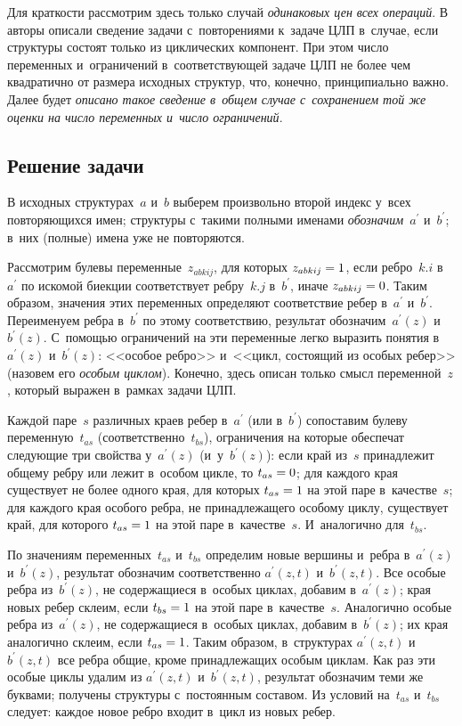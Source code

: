 \begin{multicols}{2}
  Для краткости рассмотрим здесь только случай \textit{одинаковых цен всех 
операций}. В~\cite{3-gor} авторы описали сведение задачи с~повторениями 
к~задаче ЦЛП в~случае, если структуры состоят только из циклических 
компонент. При этом число переменных и~ограничений в~соответствующей 
задаче ЦЛП не более чем квадратично от размера исходных структур, что, 
конечно, принципиально важно. Далее будет \textit{описано такое сведение 
в~общем случае с~сохранением той же оценки на число переменных и~число 
ограничений}. 
  
  \subsection{Решение задачи}
  
  В исходных структурах~$a$ и~$b$ выберем произвольно второй индекс 
у~всех повторяющихся имен; структуры с~такими полными именами 
\textit{обозначим}~$a^\prime$ и~$b^\prime$; в~них (полные) имена уже не 
повторяются.
  
  Рассмотрим булевы переменные~$z_{abkij}$, для которых $z_{abkij}\hm=1$, если 
ребро~$k.i$ в~$a^\prime$ по искомой биекции соответствует ребру~$k.j$ 
в~$b^\prime$, иначе $z_{abkij}\hm=0$. Таким образом, значения этих переменных 
определяют соответствие ребер в~$a^\prime$ и~$b^\prime$. Переименуем реб\-ра 
в~$b^\prime$ по этому соответствию, результат обозначим~$a^\prime(z)$ 
и~$b^\prime(z)$. С~по\-мощью ограничений на эти переменные легко выразить 
понятия в~$a^\prime(z)$ и~$b^\prime(z)$: <<особое ребро>> и~<<цикл, 
состоящий из особых ребер>> (назовем его \textit{особым циклом}). Конечно, 
здесь описан только смысл переменной~$z$, который выражен в~рамках задачи 
ЦЛП.
  
  Каждой паре~$s$ различных краев ребер в~$a^\prime$ (или в~$b^\prime$) 
сопоставим булеву переменную~$t_{as}$ (соответственно~$t_{bs}$), ограничения 
на которые обеспечат следующие три свойства у~$a^\prime(z)$ 
(и~у~$b^\prime(z)$): если край из~$s$ принадлежит общему ребру или лежит 
в~особом цикле, то $t_{as}\hm=0$; для каждого края существует не более одного 
края, для которых $t_{as}\hm=1$ на этой паре в~качестве~$s$; для каждого края 
особого реб\-ра, не принадлежащего особому циклу, существует край, для 
которого $t_{as}\hm=1$ на этой паре в~качестве~$s$. И~аналогично для~$t_{bs}$. 
  
  По значениям переменных~$t_{as}$ и~$t_{bs}$ определим новые вершины 
и~реб\-ра в~$a^\prime(z)$ и~$b^\prime(z)$, результат обозначим соответственно 
$a^\prime(z, t)$ и~$b^\prime(z, t)$. Все особые реб\-ра из~$b^\prime(z)$, не 
содержащиеся в~особых циклах, добавим в~$a^\prime(z)$; края новых ребер 
склеим, если $t_{bs}\hm=1$ на этой паре в~качестве~$s$. Аналогично особые реб\-ра 
из~$a^\prime(z)$, не содержащиеся в~особых циклах, добавим в~$b^\prime(z)$; 
их края аналогично склеим, если $t_{as}\hm=1$. Таким образом, в~структурах 
$a^\prime(z, t)$ и~$b^\prime(z, t)$ все реб\-ра общие, кроме принадлежащих 
особым циклам. Как раз эти особые циклы удалим из $a^\prime(z, t)$ 
и~$b^\prime(z, t)$, результат обозначим теми же буквами; получены структуры 
с~постоянным составом. Из условий на~$t_{as}$ и~$t_{bs}$ следует: каждое новое 
ребро входит в~цикл из новых ребер.
  

\end{multicols}

